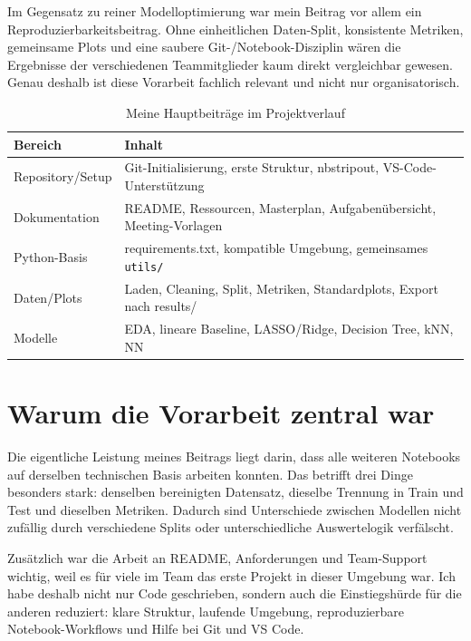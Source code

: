 \documentclass[9pt,a4paper,twocolumn,twoside]{tau-class/tau}
\begin{document}
Im Gegensatz zu reiner Modelloptimierung war mein Beitrag vor allem ein Reproduzierbarkeitsbeitrag. Ohne einheitlichen Daten-Split, konsistente Metriken, gemeinsame Plots und eine saubere Git-/Notebook-Disziplin w\"aren die Ergebnisse der verschiedenen Teammitglieder kaum direkt vergleichbar gewesen. Genau deshalb ist diese Vorarbeit fachlich relevant und nicht nur organisatorisch.

\begin{table}[H]
\centering
\caption{Meine Hauptbeitr\"age im Projektverlauf}
\label{tab:my_contribution}
\begin{tabularx}{\columnwidth}{>{\raggedright\arraybackslash}p{2.9cm}X}
\toprule
\textbf{Bereich} & \textbf{Inhalt} \\
\midrule
Repository/Setup & Git-Initialisierung, erste Struktur, nbstripout, VS-Code-Unterst\"utzung \\
Dokumentation & README, Ressourcen, Masterplan, Aufgaben\"ubersicht, Meeting-Vorlagen \\
Python-Basis & requirements.txt, kompatible Umgebung, gemeinsames \texttt{utils/} \\
Daten/Plots & Laden, Cleaning, Split, Metriken, Standardplots, Export nach results/ \\
Modelle & EDA, lineare Baseline, LASSO/Ridge, Decision Tree, kNN, NN \\
\bottomrule
\end{tabularx}
\end{table}

\section{Warum die Vorarbeit zentral war}
Die eigentliche Leistung meines Beitrags liegt darin, dass alle weiteren Notebooks auf derselben technischen Basis arbeiten konnten. Das betrifft drei Dinge besonders stark: denselben bereinigten Datensatz, dieselbe Trennung in Train und Test und dieselben Metriken. Dadurch sind Unterschiede zwischen Modellen nicht zuf\"allig durch verschiedene Splits oder unterschiedliche Auswertelogik verf\"alscht.

Zus\"atzlich war die Arbeit an README, Anforderungen und Team-Support wichtig, weil es f\"ur viele im Team das erste Projekt in dieser Umgebung war. Ich habe deshalb nicht nur Code geschrieben, sondern auch die Einstiegsh\"urde f\"ur die anderen reduziert: klare Struktur, laufende Umgebung, reproduzierbare Notebook-Workflows und Hilfe bei Git und VS Code.
\end{document}
